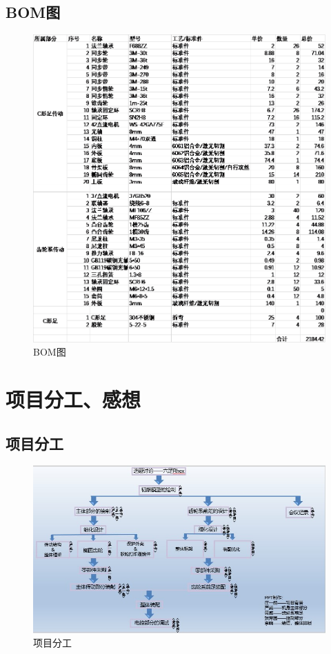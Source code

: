 \documentclass[12pt]{article}
\begin{document}
\begin{CJK}{UTF8}{gbsn}
\subsection{BOM图}
 \begin{figure}[H]
\centering
\includegraphics[width=\textwidth]{chap6//fig3.png}
\caption{BOM图}
\end{figure}

\section{项目分工、感想}
\subsection{项目分工}
 \begin{figure}[H]
\centering
\includegraphics[width=1.2\textwidth]{chap7//fig1.jpg}
\caption{项目分工}
\end{figure}


\end{CJK}
\end{document}
